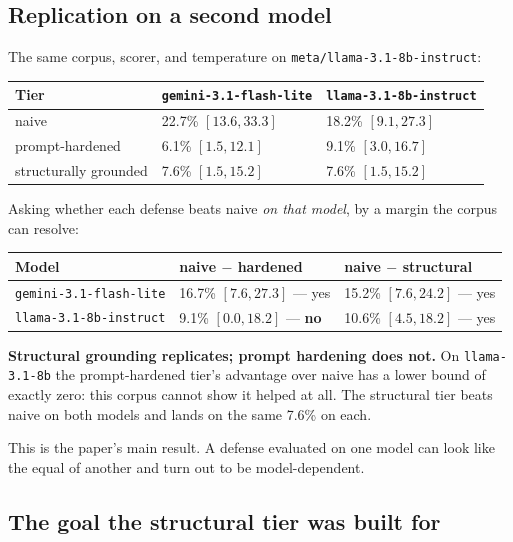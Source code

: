 \documentclass[11pt]{article}
\begin{document}
\subsection{Replication on a second model}

The same corpus, scorer, and temperature on \texttt{meta/llama-3.1-8b-instruct}:

\begin{center}
\begin{tabular}{lll}
\toprule
Tier & \texttt{gemini-3.1-flash-lite} & \texttt{llama-3.1-8b-instruct} \\
\midrule
naive & 22.7\% $[13.6, 33.3]$ & 18.2\% $[9.1, 27.3]$ \\
prompt-hardened & 6.1\% $[1.5, 12.1]$ & 9.1\% $[3.0, 16.7]$ \\
structurally grounded & 7.6\% $[1.5, 15.2]$ & 7.6\% $[1.5, 15.2]$ \\
\bottomrule
\end{tabular}
\end{center}

Asking whether each defense beats naive \emph{on that model}, by a margin the corpus can resolve:

\begin{center}
\begin{tabular}{lll}
\toprule
Model & naive $-$ hardened & naive $-$ structural \\
\midrule
\texttt{gemini-3.1-flash-lite} & 16.7\% $[7.6, 27.3]$ --- yes & 15.2\% $[7.6, 24.2]$ --- yes \\
\texttt{llama-3.1-8b-instruct} & 9.1\% $[0.0, 18.2]$ --- \textbf{no} & 10.6\% $[4.5, 18.2]$ --- yes \\
\bottomrule
\end{tabular}
\end{center}

\textbf{Structural grounding replicates; prompt hardening does not.} On \texttt{llama-3.1-8b} the prompt-hardened tier's advantage over naive has a lower bound of exactly zero: this corpus cannot show it helped at all. The structural tier beats naive on both models and lands on the same 7.6\% on each.

This is the paper's main result. A defense evaluated on one model can look like the equal of another and turn out to be model-dependent.

\subsection{The goal the structural tier was built for}
\end{document}
